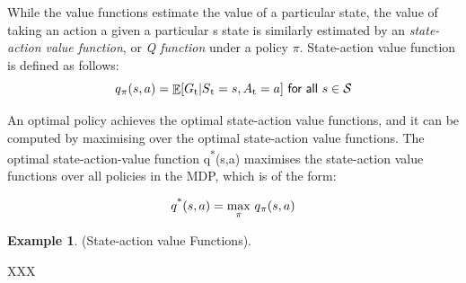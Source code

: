 \documentclass[11pt,twoside]{report}
\theoremstyle{plain}
\theoremstyle{definition}
\DeclareMathOperator{\E}{\mathbb{E}}
\newtheorem{examp}{Example}[section]
\begin{document}
While the value functions estimate the value of  a particular state, the value of taking an action a given a particular s state is similarly estimated by an \textit{state-action value function}, or \textit{Q function} under a policy $\pi$. State-action value function is defined as follows: 
\begin{equation}
q\textsubscript{$\pi$}(s, a) = \displaystyle \E [G\textsubscript{t} \vert S\textsubscript{t} = s, A\textsubscript{t} = a] \ \textsf{for all}\ s \in \mathcal{S}
\end{equation}

An optimal policy achieves the optimal state-action value functions, and it can be computed by maximising over the optimal state-action value functions.
The optimal state-action-value function q\textsuperscript{*}(s,a) maximises the state-action value functions over all policies in the MDP, which is of the form:

\begin{equation}
q\textsuperscript{*}(s, a) = \underset{\pi}{\max} \ q\textsubscript{$\pi$}(s, a)
\end{equation}

\begin{examp} \normalfont (State-action value Functions).

XXX
\end{examp}





%
%
%
%
\end{document}
